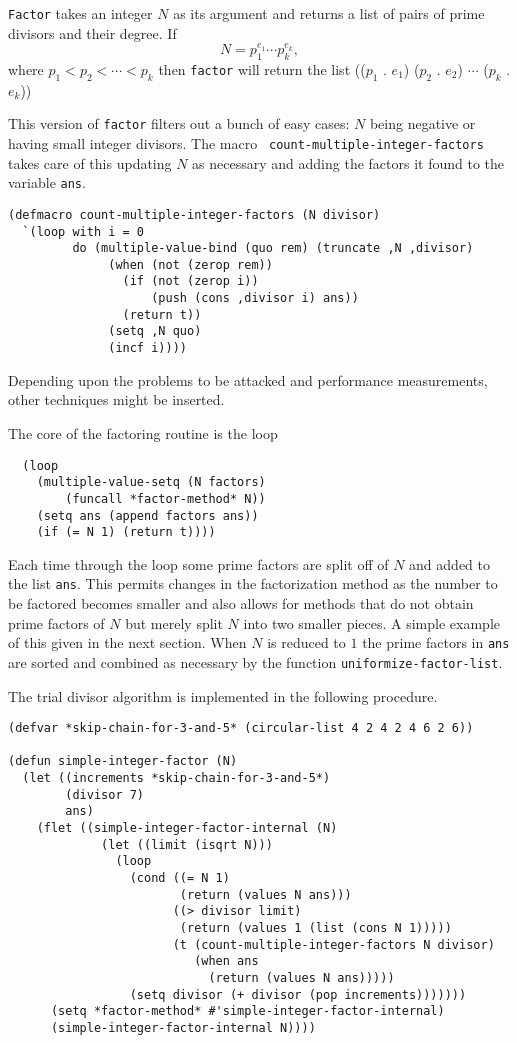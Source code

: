{\tt Factor} takes an integer $N$ as its argument and returns a list of
pairs of prime divisors and their degree.  If 
\[
N = p_{1}^{e_{1}} \cdots p_{k}^{e_{k}},
\]
where $p_{1} < p_{2} < \cdots < p_{k}$ then {\tt factor} will return the
list
\begindsacode
(($p_{1}$ . $e_{1}$) ($p_{2}$ . $e_{2}$) $\cdots$ ($p_{k}$ . $e_{k}$))
\enddsacode

This version of {\tt factor} filters out a bunch of easy cases: $N$ being
negative or having small integer divisors.  The macro {\tt
count-multiple-integer-factors} takes care of this updating $N$ as
necessary and adding the factors it found to the variable {\tt ans}.
\begin{verbatim}
(defmacro count-multiple-integer-factors (N divisor)
  `(loop with i = 0
         do (multiple-value-bind (quo rem) (truncate ,N ,divisor)
              (when (not (zerop rem))
                (if (not (zerop i))
                    (push (cons ,divisor i) ans))
                (return t))
              (setq ,N quo)
              (incf i))))
\end{verbatim}
Depending upon the problems to be attacked and performance measurements,
other techniques might be inserted.

The core of the factoring routine is the loop
\begin{verbatim}
  (loop
    (multiple-value-setq (N factors) 
        (funcall *factor-method* N))
    (setq ans (append factors ans))
    (if (= N 1) (return t))))
\end{verbatim}
Each time through the loop some prime factors are split off of $N$ and
added to the list {\tt ans}.  This permits changes in the factorization
method as the number to be factored becomes smaller and also allows for
methods that do not obtain prime factors of $N$ but merely split $N$ into
two smaller pieces.  A simple example of this given in the next section.
When $N$ is reduced to $1$ the prime factors in {\tt ans} are sorted and
combined as necessary by the function {\tt uniformize-factor-list}.

The trial divisor algorithm is implemented in the following procedure.  
\begin{verbatim}
(defvar *skip-chain-for-3-and-5* (circular-list 4 2 4 2 4 6 2 6))

(defun simple-integer-factor (N)
  (let ((increments *skip-chain-for-3-and-5*)
        (divisor 7)
        ans)
    (flet ((simple-integer-factor-internal (N)
             (let ((limit (isqrt N)))
               (loop 
                 (cond ((= N 1)
                        (return (values N ans)))
                       ((> divisor limit)
                        (return (values 1 (list (cons N 1)))))
                       (t (count-multiple-integer-factors N divisor)
                          (when ans 
                            (return (values N ans)))))
                 (setq divisor (+ divisor (pop increments)))))))      
      (setq *factor-method* #'simple-integer-factor-internal)
      (simple-integer-factor-internal N))))
\end{verbatim}

